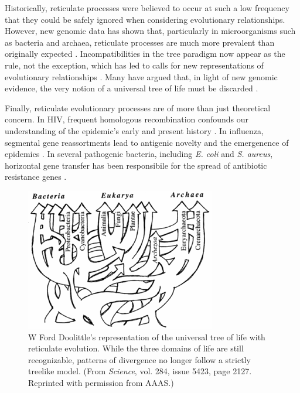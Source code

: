 Historically, reticulate processes were believed to occur at such a low frequency that they could be safely ignored when considering evolutionary relationships.
However, new genomic data has shown that, particularly in microorganisms such as bacteria and archaea, reticulate processes are much more prevalent than originally expected \cite{Ochman:2000dr}.
Incompatibilities in the tree paradigm now appear as the rule, not the exception, which has led to calls for new representations of evolutionary relationships \cite{Doolittle:1999,Doolittle:2006}.
Many have argued that, in light of new genomic evidence, the very notion of a universal tree of life must be discarded \cite{Koonin:2008bt,Koonin:2008tj}.

Finally, reticulate evolutionary processes are of more than just theoretical concern.
In HIV, frequent homologous recombination confounds our understanding of the epidemic's early and present history \cite{Burke:1997ep}.
In influenza, segmental gene reassortments lead to antigenic novelty and the emergenence of epidemics \cite{Nelson:2007bc}.
In several pathogenic bacteria, including \emph{E. coli} and \emph{S. aureus}, horizontal gene transfer has been responsibile for the spread of antibiotic resistance genes \cite{Alekshun:2007bq,Davies:2010dv}.

\begin{figure}
\centering
\includegraphics[width=.8\columnwidth]{./fig/introduction/doolittle_tree.png}
\caption[Ford Doolittle's Reticulate Tree of Life]{W Ford Doolittle's representation of the universal tree of life with reticulate evolution. While the three domains of life are still recognizable, patterns of divergence no longer follow a strictly treelike model. (From \emph{Science}, vol. 284, issue 5423, page 2127. Reprinted with permission from AAAS.)}
\label{fig:doolittle_tree}
\end{figure}


